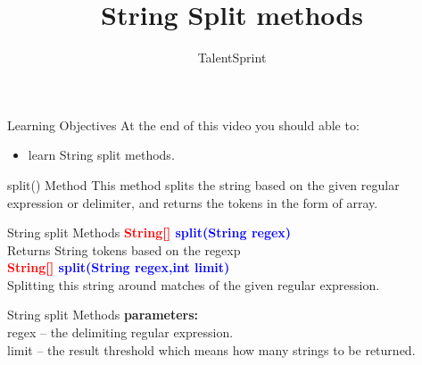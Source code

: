 \documentclass[aspectratio=169,14pt,usenames,dvipsnames]{beamer}
\title[String Split methods]{String Split methods}
\begin{document}
{\1
\begin{frame} \vspace{35pt}

\subtitle{TalentSprint}
\maketitle
\end{frame}
}

\begin{frame}{Learning Objectives}
At the end of this video you should able to:
\begin{itemize}
\item learn String split methods.
\end{itemize}
\end{frame}

\begin{frame}{split() Method}
This method splits the string based on the given
regular expression or delimiter, and returns the
tokens in the form of array.
\end{frame}

\begin{frame}{String split Methods}
\textbf{\textcolor{red}{String[]} \textcolor{blue}{split(String regex)}}\\
Returns String tokens based on the regexp\\
\vspace{1em}
\textbf{\textcolor{red}{String[]} \textcolor{blue}{split(String regex,int limit)}}\\
Splitting this string around matches of the given regular
expression.
\end{frame}



\begin{frame}{String split Methods}
\textbf{parameters:}\\
regex – the delimiting regular expression.\\
\vspace{1em}
limit – the result threshold which means how many strings
to be returned.
\end{frame}
\end{document}

